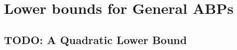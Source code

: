 \chapter{Lower bounds for General ABPs}\label{chap:gen-abp}

\section{TODO: A Quadratic Lower Bound}
